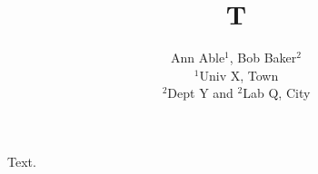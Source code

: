 \documentclass{article}
\begin{document}
\title{T}
\author{Ann Able$^{1}$, Bob Baker$^{2}$ \\ $^1$Univ X, Town \\ $^2$Dept Y and $^2$Lab Q, City}
\maketitle
Text.
\end{document}
